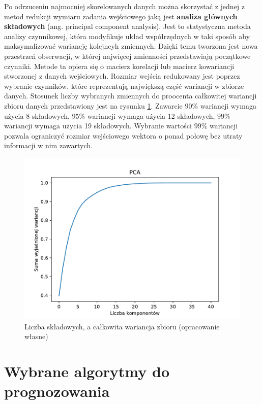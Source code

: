 \documentclass[a4paper, twoside, 11pt, openright]{article}
\begin{document}
Po odrzuceniu najmocniej skorelowanych danych można skorzystać z jednej z metod redukcji wymiaru zadania wejściowego jaką jest \textbf{analiza głównych składowych} (ang. principal component analysis). Jest to statystyczna metoda analizy czynnikowej, która modyfikuje układ współrzędnych w taki sposób aby maksymalizować wariancję kolejncyh zmiennych. Dzięki temu tworzona jest nowa przestrzeń obserwacji, w której najwięcej zmienności przedstawiają początkowe czynniki. Metode ta opiera się o macierz korelacji lub macierz kowariancji stworzonej z danych wejściowych. Rozmiar wejścia redukowany jest poprzez wybranie czynników, które reprezentują największą część wariancji w zbiorze danych. Stosunek liczby wybranych zmiennych do proocenta całkowitej wariancji zbioru danych przedstawiony jest na rysunku \ref{img:pca_variance}. Zawarcie $90\%$ wariancji wymaga użycia 8 składowych,  $95\%$ wariancji wymaga użycia 12 składowych, $99\%$ wariancji wymaga użycia 19 składowych. Wybranie wartości $99\%$ wariancji pozwala ograniczyć rozmiar wejściowego wektora o ponad połowę bez utraty informacji w nim zawartych.

\begin{figure}[H]
\centering 
\includegraphics[scale=0.9]{img/pca_variance.pdf}
\caption{Liczba składowych, a całkowita wariancja zbioru (opracowanie własne)}
\label{img:pca_variance}
\end{figure}

\newpage

\section{Wybrane algorytmy do prognozowania}
\end{document}
